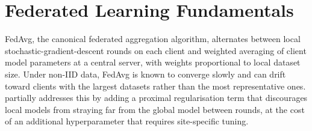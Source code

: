 \section{Federated Learning Fundamentals}
FedAvg, the canonical federated aggregation algorithm, alternates between local
stochastic-gradient-descent rounds on each client and weighted averaging of client
model parameters at a central server, with weights proportional to local dataset size.
Under non-IID data, FedAvg is known to converge slowly and can drift toward clients
with the largest datasets rather than the most representative ones. 
partially addresses this by adding a proximal regularisation term that discourages
local models from straying far from the global model between rounds, at the cost of an
additional hyperparameter that requires site-specific tuning.
